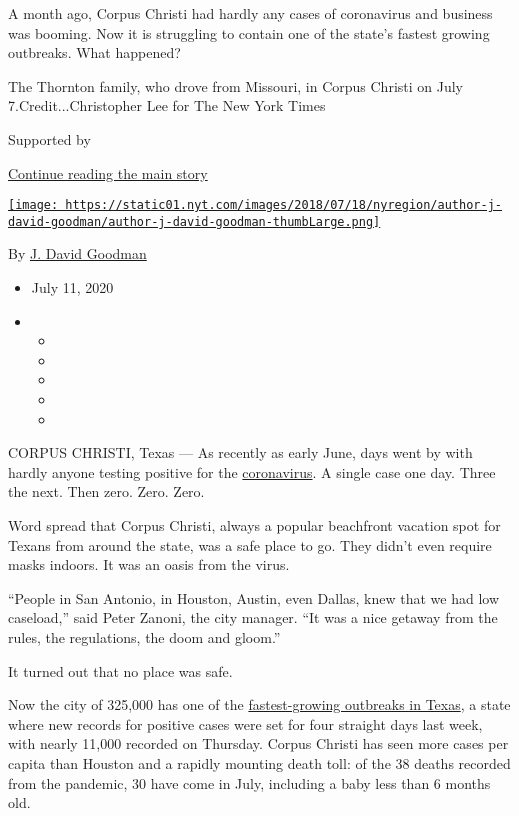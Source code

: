 A month ago, Corpus Christi had hardly any cases of coronavirus and
business was booming. Now it is struggling to contain one of the state's
fastest growing outbreaks. What happened?

The Thornton family, who drove from Missouri, in Corpus Christi on July
7.Credit...Christopher Lee for The New York Times

Supported by

\protect\hyperlink{after-sponsor}{Continue reading the main story}

\href{https://www.nytimes.com/by/j-david-goodman}{\texttt{[image: https://static01.nyt.com/images/2018/07/18/nyregion/author-j-david-goodman/author-j-david-goodman-thumbLarge.png]}}

By \href{https://www.nytimes.com/by/j-david-goodman}{J. David Goodman}

\begin{itemize}
\item
  July 11, 2020
\item
  \begin{itemize}
  \item
  \item
  \item
  \item
  \item
  \end{itemize}
\end{itemize}

CORPUS CHRISTI, Texas --- As recently as early June, days went by with
hardly anyone testing positive for the
\href{https://www.nytimes.com/2020/07/26/us/coronavirus-family-houston-masks.html}{coronavirus}.
A single case one day. Three the next. Then zero. Zero. Zero.

Word spread that Corpus Christi, always a popular beachfront vacation
spot for Texans from around the state, was a safe place to go. They
didn't even require masks indoors. It was an oasis from the virus.

``People in San Antonio, in Houston, Austin, even Dallas, knew that we
had low caseload,'' said Peter Zanoni, the city manager. ``It was a nice
getaway from the rules, the regulations, the doom and gloom.''

It turned out that no place was safe.

Now the city of 325,000 has one of the
\href{https://www.nytimes.com/interactive/2020/us/texas-coronavirus-cases.html}{fastest-growing
outbreaks in Texas}, a state where new records for positive cases were
set for four straight days last week, with nearly 11,000 recorded on
Thursday. Corpus Christi has seen more cases per capita than Houston and
a rapidly mounting death toll: of the 38 deaths recorded from the
pandemic, 30 have come in July, including a baby less than 6 months old.


